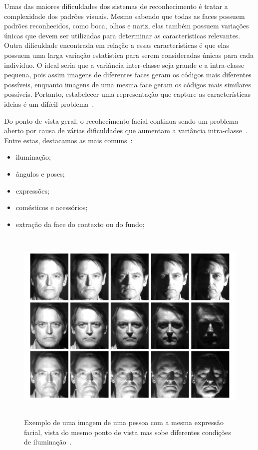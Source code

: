 Umas das maiores dificuldades dos sistemas de reconhecimento é tratar a complexidade dos padrões visuais. Mesmo sabendo que todas as faces possuem padrões reconhecidos, como boca, olhos e nariz, elas também possuem variações únicas que devem ser utilizadas para determinar as características relevantes. Outra dificuldade encontrada em relação a essas características é que elas possuem uma larga variação estatística para serem consideradas únicas para cada indivíduo. O ideal seria que a variância inter-classe seja grande e a intra-classe pequena, pois assim imagens de diferentes faces geram os códigos mais diferentes possíveis, enquanto imagens de uma mesma face geram os códigos mais similares possíveis. Portanto, estabelecer uma representação que capture as características ideias é um difícil problema~\cite{saocarlos}.

Do ponto de vista geral, o recohecimento facial continua sendo um problema aberto por causa de várias dificuldades que aumentam a variância intra-classe~\cite{hong}. Entre estas, destacamos as mais comuns~\cite{saocarlos}:

	\begin{itemize}
		\item iluminação;
		\item ângulos e poses;
		\item expressões;
		\item comésticos e acessórios;
		\item extração da face do contexto ou do fundo;
	\end{itemize}

	\begin{figure}[hbt]
		\begin{center}
			\includegraphics[height=9.5cm,width=12.5cm]{figuras/2.FundamentacaoTeorica/diferencailuminacao.png}
		\end{center}
		\caption{Exemplo de uma imagem de uma pessoa com a mesma expressão facial, vista do mesmo ponto de vista mas sobe diferentes condições de iluminação~\cite{belhumeur}.}
		\label{diferencailuminacao}
	\end{figure}

